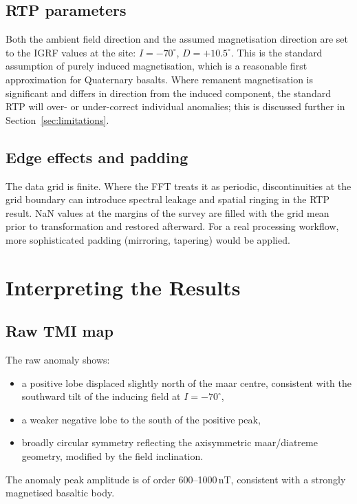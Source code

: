 \documentclass[11pt,a4paper]{article}
\begin{document}
\subsection{RTP parameters}

Both the ambient field direction and the assumed magnetisation direction
are set to the IGRF values at the site:
$I = -70^\circ$, $D = +10.5^\circ$.
This is the standard assumption of purely induced magnetisation, which is
a reasonable first approximation for Quaternary basalts.
Where remanent magnetisation is significant and differs in direction
from the induced component, the standard RTP will over- or under-correct
individual anomalies; this is discussed further in Section~\ref{sec:limitations}.

\subsection{Edge effects and padding}

The data grid is finite.
Where the FFT treats it as periodic, discontinuities at the grid boundary
can introduce spectral leakage and spatial ringing in the RTP result.
NaN values at the margins of the survey are filled with the grid mean prior
to transformation and restored afterward.
For a real processing workflow, more sophisticated padding (mirroring,
tapering) would be applied.

\section{Interpreting the Results}

\subsection{Raw TMI map}

The raw anomaly shows:
\begin{itemize}
  \item a positive lobe displaced slightly north of the maar centre, consistent
        with the southward tilt of the inducing field at $I = -70^\circ$,
  \item a weaker negative lobe to the south of the positive peak,
  \item broadly circular symmetry reflecting the axisymmetric maar/diatreme
        geometry, modified by the field inclination.
\end{itemize}
The anomaly peak amplitude is of order 600--1000\,nT, consistent with a
strongly magnetised basaltic body.
\end{document}
